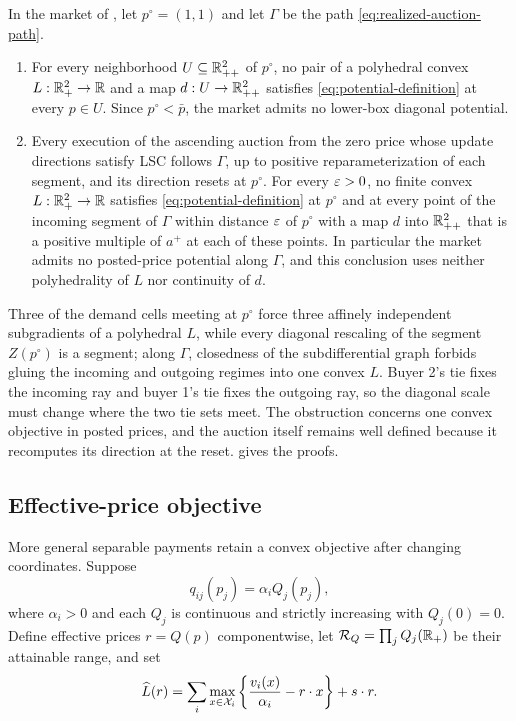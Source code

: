 \begin{theorem}\label{thm:lower-path}
In the market of , let $p^\circ=(1,1)$ and let $\Gamma$ be the path \eqref{eq:realized-auction-path}.
\begin{enumerate}[label=(\roman*),leftmargin=2.2em]
\item For every neighborhood $U\subseteq\mathbb{R}_{++}^2$ of $p^\circ$, no pair of a polyhedral convex $L:\mathbb{R}_+^2\to\mathbb{R}$ and a map $d:U\to\mathbb{R}_{++}^2$ satisfies \eqref{eq:potential-definition} at every $p\in U$. Since $p^\circ<\bar p$, the market admits no lower-box diagonal potential.
\item Every execution of the ascending auction from the zero price whose update directions satisfy LSC follows $\Gamma$, up to positive reparameterization of each segment, and its direction resets at $p^\circ$. For every $\varepsilon>0$, no finite convex $L:\mathbb{R}_+^2\to\mathbb{R}$ satisfies \eqref{eq:potential-definition} at $p^\circ$ and at every point of the incoming segment of $\Gamma$ within distance $\varepsilon$ of $p^\circ$ with a map $d$ into $\mathbb{R}_{++}^2$ that is a positive multiple of $a^+$ at each of these points. In particular the market admits no posted-price potential along $\Gamma$, and this conclusion uses neither polyhedrality of $L$ nor continuity of $d$.
\end{enumerate}
\end{theorem}

Three of the demand cells meeting at $p^\circ$ force three affinely independent subgradients of a polyhedral $L$, while every diagonal rescaling of the segment $Z(p^\circ)$ is a segment; along $\Gamma$, closedness of the subdifferential graph forbids gluing the incoming and outgoing regimes into one convex $L$. Buyer 2's tie fixes the incoming ray and buyer 1's tie fixes the outgoing ray, so the diagonal scale must change where the two tie sets meet. The obstruction concerns one convex objective in posted prices, and the auction itself remains well defined because it recomputes its direction at the reset.  gives the proofs.

\subsection{Effective-price objective}\label{subsec:effective-objective}

More general separable payments retain a convex objective after changing coordinates. Suppose
\begin{equation}\label{eq:general-separable}
q_{ij}(p_j)=\alpha_iQ_j(p_j),
\end{equation}
where $\alpha_i>0$ and each $Q_j$ is continuous and strictly increasing with $Q_j(0)=0$. Define effective prices $r=Q(p)$ componentwise, let $\mathcal R_Q=\prod_j Q_j(\mathbb{R}_+)$ be their attainable range, and set
\begin{equation}\label{eq:Lhat}
\widehat L(r)=
\sum_i\max_{x\in\mathcal{X}_i}
\left\{\frac{v_i(x)}{\alpha_i}-r\cdot x\right\}
+s\cdot r.
\end{equation}

